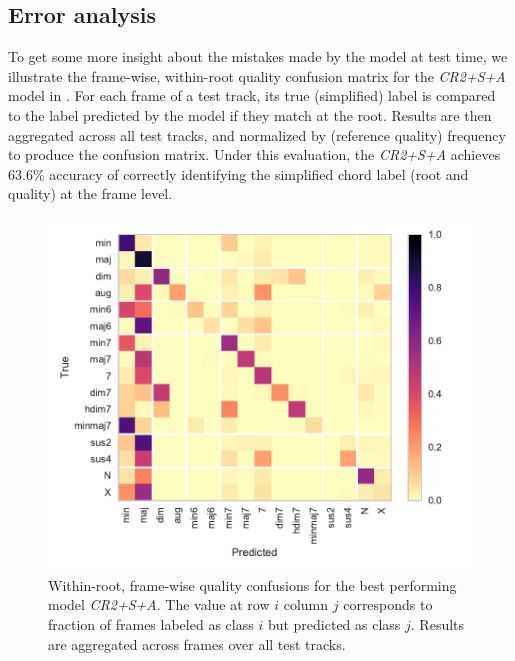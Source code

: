 \documentclass{article}
\begin{document}
\subsection{Error analysis}

To get some more insight about the mistakes made by the model at test time, we illustrate the frame-wise, within-root quality confusion matrix for the \emph{CR2+S+A} model in .
For each frame of a test track, its true (simplified) label is compared to the label predicted by the model if they match at the root.
Results are then aggregated across all test tracks, and normalized by (reference quality) frequency to produce the confusion matrix.
Under this evaluation, the \emph{CR2+S+A} achieves 63.6\% accuracy of correctly identifying the simplified chord label (root and quality) at the frame level.

\begin{figure}
    \centering
    \includegraphics[width=\columnwidth]{qualconf}
    \caption{Within-root, frame-wise quality confusions for the best performing model \emph{CR2+S+A}.
    The value at row $i$ column $j$ corresponds to fraction of frames labeled as class $i$ but predicted as class $j$.
    Results are aggregated across frames over all test tracks.\label{fig:confusion}}
\end{figure}
\end{document}
